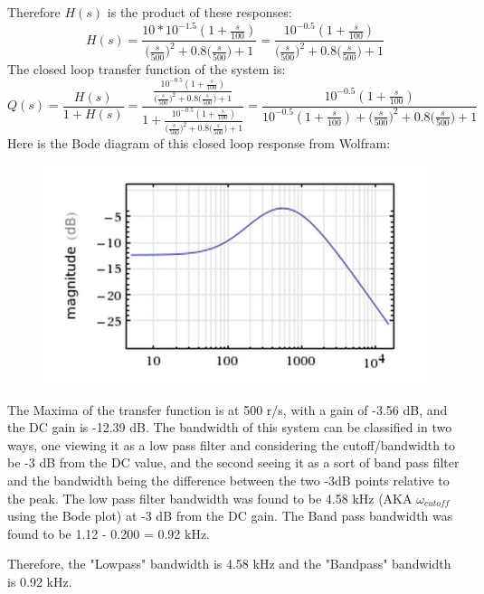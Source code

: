 \documentclass[12pt,letterpaper]{article}
\begin{document}
Therefore $H(s)$ is the product of these responses:
\begin{equation}
H(s) = \frac{10* 10^{-1.5}(1+\frac{s}{100})}{\big(\frac{s}{500}\big)^2+0.8\big(\frac{s}{500}\big)+1}= \frac{10^{-0.5}(1+\frac{s}{100})}{\big(\frac{s}{500}\big)^2+0.8\big(\frac{s}{500}\big)+1}
\end{equation}
The closed loop transfer function of the system is:
\begin{equation}
Q(s) = \frac{H(s)}{1+H(s)} = \frac{\frac{10^{-0.5}(1+\frac{s}{100})}{\big(\frac{s}{500}\big)^2+0.8\big(\frac{s}{500}\big)+1}}{1 + \frac{10^{-0.5}(1+\frac{s}{100})}{\big(\frac{s}{500}\big)^2+0.8\big(\frac{s}{500}\big)+1}} = \frac{10^{-0.5}(1+\frac{s}{100})}{10^{-0.5}(1+\frac{s}{100}) + \big(\frac{s}{500}\big)^2+0.8\big(\frac{s}{500}\big)+1}
\end{equation}
Here is the Bode diagram of this closed loop response from Wolfram:
\begin{figure}[h!]
\begin{center}
 \includegraphics[scale=0.4]{./plots/s.png}
\end{center}
\end{figure}
\FloatBarrier
The Maxima of the transfer function is at 500 r/s, with a gain of -3.56 dB, and the DC gain is -12.39 dB. The bandwidth of this system can be classified in two ways, one viewing it as a low pass filter and considering the cutoff/bandwidth to be -3 dB from the DC value, and the second seeing it as a sort of band pass filter and the bandwidth being the difference between the two -3dB points relative to the peak. The low pass filter bandwidth was found to be 4.58 kHz (AKA $\omega_{cutoff}$ using the Bode plot) at -3 dB from the DC gain. The Band pass bandwidth was found to be 1.12 - 0.200 = 0.92 kHz.\\\par

Therefore, the "Lowpass" bandwidth is 4.58 kHz and the "Bandpass" bandwidth is 0.92 kHz.
\end{document}
